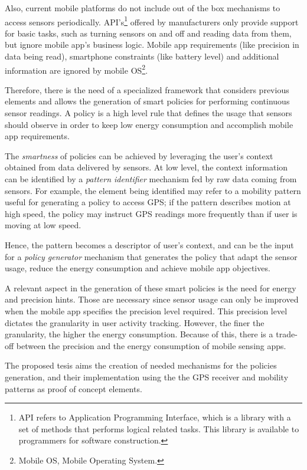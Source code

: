 Also, current mobile platforms do not include out of the box mechanisms to access sensors periodically.
API’s\footnote{API refers to Application Programming Interface, which is a library with a set of methods that performs logical related tasks. This library is available to programmers for software construction.} offered by manufacturers only provide support for basic tasks, such as turning sensors on and off and reading data from them, but ignore mobile app’s business logic.
Mobile app requirements (like precision in data being read), smartphone constraints (like battery level) and additional information are ignored by mobile OS\footnote{Mobile OS, Mobile Operating System.}.


Therefore, there is the need of a specialized framework that considers previous elements and allows the generation of smart policies for performing continuous sensor readings.
A policy is a high level rule that defines the usage that sensors should observe in order to keep low energy consumption and accomplish mobile app requirements.


The \emph{smartness} of policies can be achieved by leveraging the user’s context obtained from data delivered by sensors.
At low level, the context information can be identified by a \emph{pattern identifier} mechanism fed by raw data coming from sensors.
For example, the element being identified may refer to a mobility pattern useful for generating a policy to access GPS; if the pattern describes motion at high speed, the policy may instruct GPS readings more frequently than if user is moving at low speed.



Hence, the pattern becomes a descriptor of user's context, and can be the input for a \emph{policy generator} mechanism that generates the policy that adapt the sensor usage, reduce the energy consumption and achieve mobile app objectives.


A relevant aspect in the generation of these smart policies is the need for energy and precision hints.
Those are necessary since sensor usage can only be improved when the mobile app specifies the precision level required.
This precision level dictates the granularity in user activity tracking.
However, the finer the granularity, the higher the energy consumption. 
Because of this, there is a trade-off between the precision and the energy consumption of mobile sensing apps.


The proposed tesis aims the creation of needed mechanisms for the policies generation, and their implementation using the the GPS receiver and mobility patterns as proof of concept elements.


